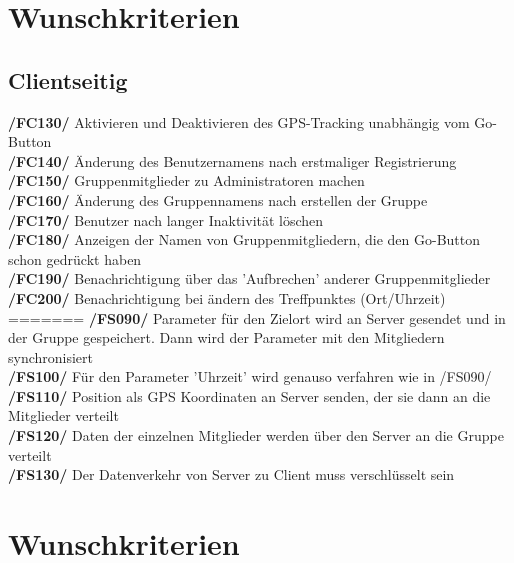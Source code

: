 \section{Wunschkriterien}
\subsection{Clientseitig}
     \textbf{/FC130/} Aktivieren und Deaktivieren des GPS-Tracking unabhängig vom Go-Button\\
     \textbf{/FC140/} Änderung des Benutzernamens nach erstmaliger Registrierung\\
     \textbf{/FC150/} Gruppenmitglieder zu Administratoren machen                \\
     \textbf{/FC160/} Änderung des Gruppennamens nach erstellen der Gruppe        \\
     \textbf{/FC170/} Benutzer nach langer Inaktivität löschen                     \\
     \textbf{/FC180/} Anzeigen der Namen von Gruppenmitgliedern, die den Go-Button schon gedrückt haben\\
     \textbf{/FC190/} Benachrichtigung über das 'Aufbrechen' anderer Gruppenmitglieder\\
     \textbf{/FC200/} Benachrichtigung bei ändern des Treffpunktes (Ort/Uhrzeit)\\
=======
     \textbf{/FS090/} Parameter für den Zielort wird an Server gesendet und in der Gruppe gespeichert. Dann wird der Parameter mit den Mitgliedern synchronisiert \\
     \textbf{/FS100/} Für den Parameter 'Uhrzeit' wird genauso verfahren wie in /FS090/ \\
     \textbf{/FS110/} Position als GPS Koordinaten an Server senden, der sie dann an die Mitglieder verteilt\\
     \textbf{/FS120/} Daten der einzelnen Mitglieder werden über den Server an die Gruppe verteilt \\
     \textbf{/FS130/} Der Datenverkehr von Server zu Client muss verschlüsselt sein\\
\section{Wunschkriterien}
